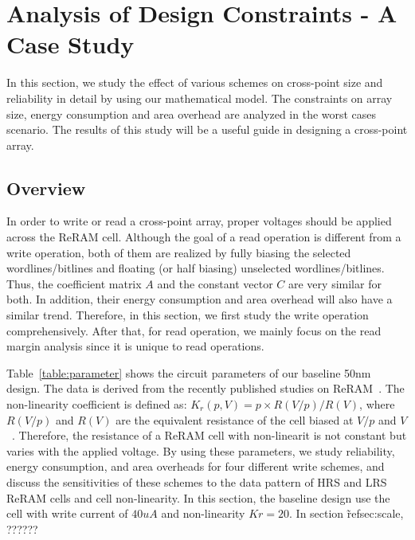 \vspace{-4pt}
\section{Analysis of Design Constraints - A Case Study}\label{sec:w_and_r}

In this section, we study the effect of various schemes on cross-point
size and reliability in detail by using our mathematical model. The
constraints on array size, energy consumption and area overhead are
analyzed in the worst cases scenario. The results of this study will be a
useful guide in designing a cross-point array.

\vspace{-10pt}
\subsection{Overview}
In order to write or read a cross-point array, proper voltages should be
applied across the ReRAM cell. Although the goal of a read operation is
different from a write operation, both of them are realized by fully
biasing the selected wordlines/bitlines and floating (or half biasing)
unselected wordlines/bitlines. Thus, the coefficient matrix $A$ and the
constant vector $C$ are very similar for both. In addition, their energy
consumption and area overhead will also have a similar trend. Therefore,
in this section, we first study the write operation comprehensively. After
that, for read operation, we mainly focus on the read margin analysis
since it is unique to read operations.

Table~\ref{table:parameter} shows the circuit parameters of our baseline
50nm design. The data is derived from the recently published studies on
ReRAM~\cite{ReRAM_overview,memristor:Cong,ReRAM_Renesas}. The non-linearity coefficient is
defined as: $K_r(p,V) = p \times R(V/p)/R(V)$, where $R(V/p)$ and $R(V)$
are the equivalent resistance of the cell biased at $V/p$ and
$V$~\cite{memristor:Cong}. Therefore, the resistance of a ReRAM cell with
non-linearit is not constant but varies with the applied voltage. By using
these parameters, we study reliability, energy consumption, and area
overheads for four different write schemes, and discuss the sensitivities
of these schemes to the data pattern of HRS and LRS ReRAM cells and cell
non-linearity. In this section, the baseline design use the cell with
write current of $40 uA$ and non-linearity $Kr=20$. In section
\~ref{sec:scale}, ??????

